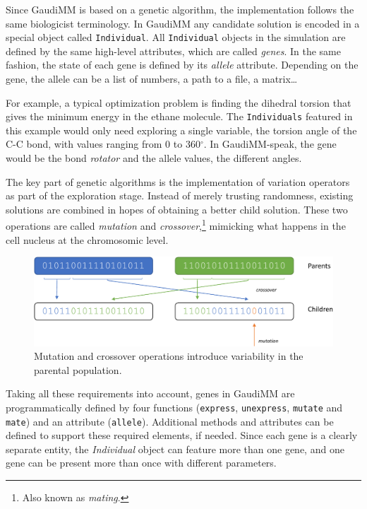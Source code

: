 Since GaudiMM is based on a genetic algorithm, the implementation follows the same biologicist terminology. In GaudiMM any candidate solution is encoded in a special object called \texttt{Individual}. All \texttt{Individual} objects in the simulation are defined by the same high-level attributes, which are called \textit{genes}. In the same fashion, the state of each gene is defined by its \textit{allele} attribute. Depending on the gene, the allele can be a list of numbers, a path to a file, a matrix\ldots

For example, a typical optimization problem is finding the dihedral torsion that gives the minimum energy in the ethane molecule. The \texttt{Individuals} featured in this example would only need exploring a single variable, the torsion angle of the C-C bond, with values ranging from 0 to 360$^\circ$. In GaudiMM-speak, the gene would be the bond \textit{rotator} and the allele values, the different angles.

The key part of genetic algorithms is the implementation of variation operators as part of the exploration stage. Instead of merely trusting randomness, existing solutions are combined in hopes of obtaining a better child solution. These two operations are called \textit{mutation} and \textit{crossover},\footnote{Also known as \textit{mating}.} mimicking what happens in the cell nucleus at the chromosomic level.


\begin{figure}[H] %
	\includegraphics[width=\textwidth]{./figures/04/ga-crossover-mut-crop.pdf}
	\caption[Mutation and crossover]{Mutation and crossover operations introduce variability in the parental population.}
	\label{fig:cxmut}
\end{figure}

Taking all these requirements into account, genes in GaudiMM are programmatically defined by four functions (\texttt{express}, \texttt{unexpress}, \texttt{mutate} and \texttt{mate}) and an attribute (\texttt{allele}). Additional methods and attributes can be defined to support these required elements, if needed. Since each gene is a clearly separate entity, the \textit{Individual} object can feature more than one gene, and one gene can be present more than once with different parameters.

